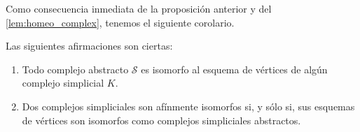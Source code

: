 Como consecuencia inmediata de la proposición anterior y del
\autoref{lem:homeo_complex}, tenemos el siguiente corolario.

\begin{corolario}
	Las siguientes afirmaciones son ciertas:
	\begin{enumerate}[label=(\alph{*})]
		\item Todo complejo abstracto $\mathcal{S}$ es isomorfo al esquema de vértices
		de algún complejo simplicial $K$.
		
		\item Dos complejos simpliciales son afínmente isomorfos si, y sólo si, sus esquemas
		de vértices son isomorfos como complejos simpliciales abstractos.
	\end{enumerate}
\end{corolario}

\endinput

